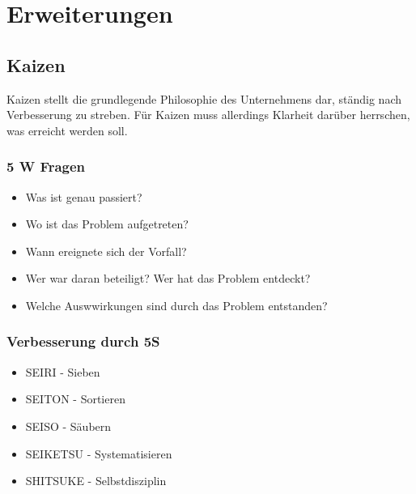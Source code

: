 \documentclass[00_ToyotaProduktionssystem.tex]{subfiles}
\begin{document}
\section{Erweiterungen}

\subsection{Kaizen}
Kaizen stellt die grundlegende Philosophie des Unternehmens dar, ständig nach Verbesserung zu streben. Für Kaizen muss allerdings Klarheit darüber herrschen, was erreicht werden soll. 

\subsubsection{5 W Fragen}
\begin{itemize}
\item{Was ist genau passiert?}
\item{Wo ist das Problem aufgetreten?}
\item{Wann ereignete sich der Vorfall?}
\item{Wer war daran beteiligt? Wer hat das Problem entdeckt?}
\item{Welche Auswwirkungen sind durch das Problem entstanden?}
\end{itemize}


\subsubsection{Verbesserung durch 5S}
\begin{itemize}
\item{SEIRI - Sieben}
\item{SEITON - Sortieren}
\item{SEISO - Säubern}
\item{SEIKETSU - Systematisieren}
\item{SHITSUKE - Selbstdisziplin}
\end{itemize}
\end{document}
